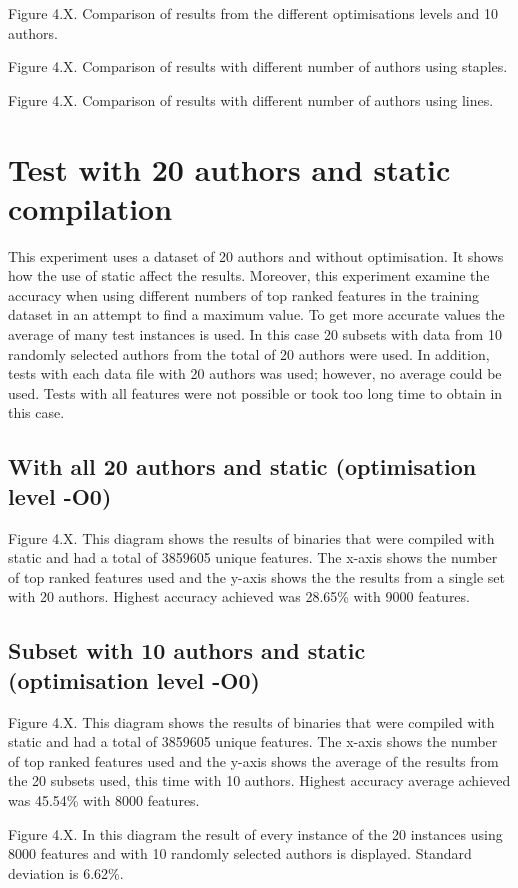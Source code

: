 \documentclass[a4paper,11pt]{kth-mag}
\begin{document}
Figure 4.X. Comparison of results from the different optimisations levels and
10 authors.

Figure 4.X. Comparison of results with different number of authors using
staples.

Figure 4.X. Comparison of results with different number of authors using
lines.

\section{Test with 20 authors and static compilation}
This experiment uses a dataset of 20 authors and without  optimisation. It
shows how the use of static affect the results. Moreover, this experiment
examine the accuracy when using different numbers of top ranked features in the
training dataset in an attempt to find a maximum value.  To get more accurate
values the average of many test instances is used. In this case 20 subsets with
data from 10 randomly selected authors from the total of 20 authors were used.
In addition, tests with each data file with 20 authors was used; however, no
average could be used. Tests with all features were not possible or took too
long time to obtain in this case.   

\subsection{With all 20 authors and static (optimisation level -O0)}
Figure 4.X. This diagram shows the results of binaries that were compiled with
static and had a total of 3859605 unique features. The x-axis shows the number
of top ranked features used and the y-axis shows the the results from a single
set with 20 authors. Highest accuracy achieved was 28.65\% with 9000 features.

\subsection{Subset with 10 authors and static (optimisation level -O0)}
Figure 4.X. This diagram shows the results of binaries that were compiled with
static and had a total of 3859605 unique features. The x-axis shows the number
of top ranked features used and the y-axis shows the average of the results
from the 20 subsets used, this time with 10 authors. Highest accuracy average
achieved was 45.54\% with 8000 features.

Figure 4.X. In this diagram the result of every instance of the 20 instances
using 8000 features and with 10 randomly selected authors is displayed.
Standard deviation is 6.62\%.
\end{document}
